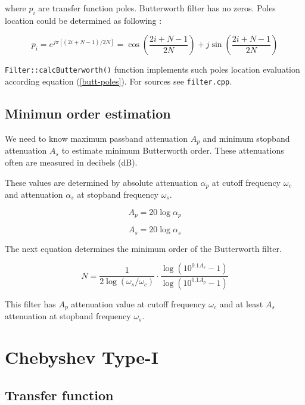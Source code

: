 where $p_i$ are transfer function poles. Butterworth filter has no zeros. Poles
location could be determined as following \cite{Hamming}:

\begin{equation}
 p_i = e^{j\pi[(2i+N-1)/2N]} = 
 \cos\left(\frac{2i+N-1}{2N}\right) + j\sin\left(\frac{2i+N-1}{2N}\right)
\label{butt-poles}
\end{equation}

\verb|Filter::calcButterworth()| function implements such poles location
evaluation according equation (\ref{butt-poles}). For sources see
\verb|filter.cpp|.


\subsection{Minimun order estimation}

We need to know maximum passband attenuation $A_p$ and minimum stopband
attenuation $A_s$ to estimate minimum Butterworth order. These attenuations
often are measured in decibels (dB).

These values are determined by absolute attenuation $\alpha_p$ at cutoff
frequency $\omega_c$ and attenuation $\alpha_s$ at stopband frequency
$\omega_s$.

\begin{equation}
 A_p = 20\log\alpha_p
\end{equation}

\begin{equation}
 A_s = 20\log\alpha_s
\end{equation}



The next equation determines the minimum order of the Butterworth filter.

\begin{equation}
 N = \frac{1}{2\log(\omega_s/\omega_c)} \cdot
\frac{\log(10^{0.1A_s}-1)}{\log(10^{0.1A_p}-1) } \label{butt-order}
\end{equation}

This filter has $A_p$ attenuation value at cutoff frequency $\omega_c$
and at least $A_s$ attenuation at stopband frequency $\omega_s$.


\section{Chebyshev Type-I}

\subsection{Transfer function}


